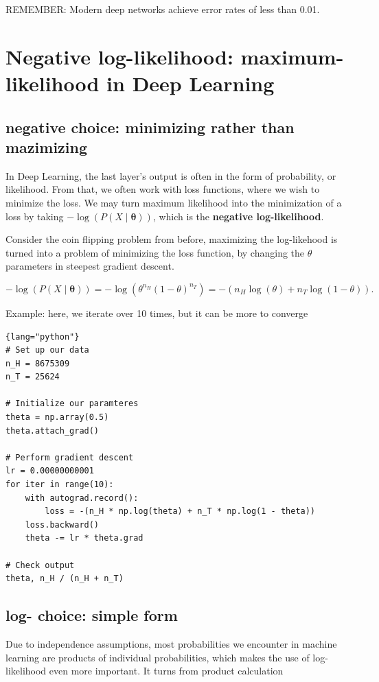 REMEMBER: Modern deep networks achieve error rates of less than 0.01.



\section{Negative log-likelihood: maximum-likelihood in Deep Learning}



\subsection{negative choice: minimizing rather than mazimizing}

In Deep Learning, the last layer's output is often in the form of probability,
or likelihood.
From that, we often work with loss functions, where we wish to minimize the
loss.
We may turn maximum likelihood into the minimization of a loss by taking
$-\log(P(X \mid \boldsymbol{\theta}))$, which is the {\bf negative log-likelihood}.

Consider the coin flipping problem from before, maximizing the log-likehood is
turned into a problem of minimizing the loss function, by changing the $\theta$
parameters in steepest gradient descent.
 
$$
-\log(P(X \mid \boldsymbol{\theta})) = -\log(\theta^{n_H}(1-\theta)^{n_T}) = -(n_H\log(\theta) + n_T\log(1-\theta)).
$$

Example: here, we iterate over 10 times, but it can be more to converge
\begin{lstlisting}{lang="python"}
# Set up our data
n_H = 8675309
n_T = 25624

# Initialize our paramteres
theta = np.array(0.5)
theta.attach_grad()

# Perform gradient descent
lr = 0.00000000001
for iter in range(10):
    with autograd.record():
        loss = -(n_H * np.log(theta) + n_T * np.log(1 - theta))
    loss.backward()
    theta -= lr * theta.grad

# Check output
theta, n_H / (n_H + n_T)
\end{lstlisting}

\subsection{log- choice: simple form}

Due to independence assumptions, most probabilities we encounter in machine
learning are products of individual probabilities, which makes the use of
 log-likelihood even more important.
It turns from product calculation

